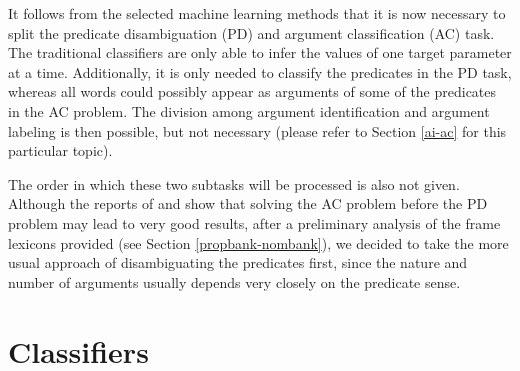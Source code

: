\documentclass[12pt,notitlepage,a4paper]{report}
\begin{document}
It follows from the selected machine learning methods that it is now necessary to split the predicate disambiguation (PD) and argument classification (AC) task. The traditional classifiers are only able to infer the values of one target parameter at a time. Additionally, it is only needed to classify the predicates in the PD task, whereas all words could possibly appear as arguments of some of the predicates in the AC problem. The division among argument identification and argument labeling is then possible, but not necessary (please refer to Section \ref{ai-ac} for this particular topic).

The order in which these two subtasks will be processed is also not given. Although the reports of \citet{bohnet09} and \citet{zhao09} show that solving the AC problem before the PD problem may lead to very good results, after a preliminary analysis of the frame lexicons provided (see Section \ref{propbank-nombank}), we decided to take the more usual approach of disambiguating the predicates first, since the nature and number of arguments usually depends very closely on the predicate sense.

\section{Classifiers}\label{classifiers}
\end{document}
